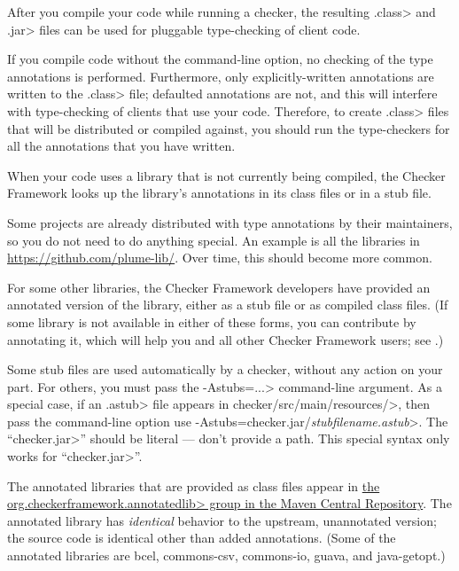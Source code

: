 After you compile your code while running a checker, the resulting
\<.class> and \<.jar> files can be used for pluggable type-checking of client code.

If you compile code without the 
command-line option, no checking of the type
annotations is performed.  Furthermore, only explicitly-written annotations
are written to the \<.class> file; defaulted annotations are not, and this
will interfere with type-checking of clients that use your code.
Therefore, to create
\<.class> files that will be distributed or compiled against, you should run the
type-checkers for all the annotations that you have written.



When your code uses a library that is not currently being compiled, the
Checker Framework looks up the library's annotations in its class files or
in a stub file.

Some projects are already distributed with type annotations by their
maintainers, so you do not need to do anything special.
An example is all the libraries in \url{https://github.com/plume-lib/}.
Over time, this should become more common.

For some other libraries, the Checker Framework developers have provided an
annotated version of the library, either as a stub file or as compiled class files.
(If some library is not available in either of these forms,
you can contribute by annotating it, which will
help you and all other Checker Framework users; see
.)

Some stub files are used automatically by a checker, without any action on
your part.  For others, you must pass the \<-Astubs=...> command-line argument.
As a special case, if an \<.astub> file appears in
\<checker/src/main/resources/>, then pass the command-line option
use \<-Astubs=checker.jar/\emph{stubfilename.astub}>.
The ``\<checker.jar>'' should be literal --- don't provide a path.
This special syntax only works for ``\<checker.jar>''.

The annotated libraries that are provided as class files appear in
\href{https://central.sonatype.com/search?q=org.checkerframework.annotatedlib}{the
  \<org.checkerframework.annotatedlib> group in the Maven Central Repository}.
The annotated library has \emph{identical} behavior to the upstream,
unannotated version; the source code is identical other than added
annotations.
%
(Some of the annotated libraries are
bcel,
commons-csv,
commons-io,
guava,
and
java-getopt.)

